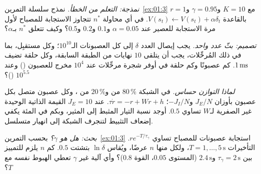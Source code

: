 \begin{exercise}[\lvlB]
\label{ex:01:4}
\emph{نمذجة: التعلم من الخطأ.} نمذج سلسلة التمرين~\ref{ex:01:3} مع $K=10$ و$\gamma=0.95$ و$r=1$ بالقاعدة $V(s_t)\leftarrow V(s_t)+\alpha\delta_t$. في أي محاولة $n^*$ تتجاوز الاستجابة للمصباح لأول مرة الاستجابة للعصير عند $\alpha=0.05$ و$0.1$ و$0.2$ و$0.5$؟ وكيف تتعلق $n^*$ بـ$\alpha$؟
\end{exercise}

\begin{exercise}[\lvlB]
\label{ex:01:5}
\emph{تصميم: بثّ عدد واحد.} يجب إيصال العدد $\delta$ إلى كل العصبونات الـ$10^{10}$؛ وكل مستقبِل، بما في ذلك المُرحِّلات، يجب أن يتلقى $10$ نهايات من الطبقة السابقة، وكل حلقة تضيف $1\,\text{ms}$. كم عصبونًا وكم حلقة في أوفر شجرة مرحِّلات عند $10^4$ مخرج للعصبون () وعند $10^{5.5}$ ()؟
\end{exercise}

\begin{exercise}[\lvlB]
\label{ex:01:6}
\emph{لماذا التوازن حساس.} في الشبكة $80\,\%$ من  و$20\,\%$ من ، وكل عصبون متصل بكل عصبون بأوزان $J_E/N$ و$-J_I/N$؛ $\tau\dot r=-r+Wr+h$. عند $J_E=10$ القيمة الذاتية الوحيدة غير الصفرية لـ$W$ تساوي $0.5$. أوجد نسبة التيار المثبط إلى المثير، وبكم في المئة يكفي إضعاف التثبيط لتنجرف الشبكة إلى انهيار متسلسل.
\end{exercise}

\begin{exercise}[\lvlC]
\label{ex:01:7}
\emph{بحث: هل  هو $\gamma$؟} بحسب التمرين~\ref{ex:01:3} استجابة عصبونات  للمصباح تساوي $re^{-T/\tau_\gamma}$. التأخيرات $T=1,\dots,5\,\mathrm{s}$، ولكل منها $n$ عرضًا، ويُقاس $\ln\delta$ بتشتت $0.5$. كم $n$ يلزم للتمييز بين $\tau_\gamma=2\,\mathrm{s}$ و$2.4\,\mathrm{s}$ (المستوى $0.05$، القوة $0.8$)؟ وأي آلية غير $\gamma$ تعطي الهبوط نفسه مع $T$؟
\end{exercise}

